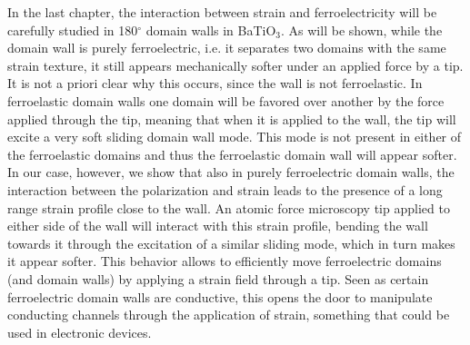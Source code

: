 In the last chapter, the interaction between strain and ferroelectricity will be carefully studied in 180$^\circ$ domain walls in BaTiO$_3$.
As will be shown, while the domain wall is purely ferroelectric, i.e. it separates two domains with the same strain texture, it still appears mechanically softer under an applied force by a tip.
It is not a priori clear why this occurs, since the wall is not ferroelastic.
In ferroelastic domain walls one domain will be favored over another by the force applied through the tip, meaning that when it is applied to the wall, the tip will excite a very soft sliding domain wall mode.
This mode is not present in either of the ferroelastic domains and thus the ferroelastic domain wall will appear softer.
In our case, however, we show that also in purely ferroelectric domain walls, the interaction between the polarization and strain leads to the presence of a long range strain profile close to the wall.
An atomic force microscopy tip applied to either side of the wall will interact with this strain profile, bending the wall towards it through the excitation of a similar sliding mode, which in turn makes it appear softer.
This behavior allows to efficiently move ferroelectric domains (and domain walls) by applying a strain field through a tip.
Seen as certain ferroelectric domain walls are conductive, this opens the door to manipulate conducting channels through the application of strain, something that could be used in electronic devices.


